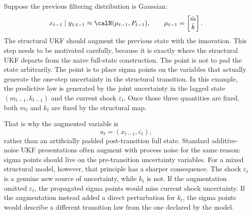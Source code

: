 Suppose the previous filtering distribution is Gaussian:
\begin{equation}
  x_{t-1}\mid y_{1:t-1}
  \approx \calN(\mu_{t-1},P_{t-1}),
  \qquad
  \mu_{t-1}=
  \begin{bmatrix}\bar m\\ \bar k\end{bmatrix}.
\end{equation}
The structural UKF should augment the previous state with the innovation.  This
step needs to be motivated carefully, because it is exactly where the structural
UKF departs from the naive full-state construction.  The point is not to pad the
state arbitrarily.  The point is to place sigma points on the variables that
actually generate the one-step uncertainty in the structural transition.  In
this example, the predictive law is generated by the joint uncertainty in the
lagged state $(m_{t-1},k_{t-1})$ and the current shock $\varepsilon_t$.  Once
those three quantities are fixed, both $m_t$ and $k_t$ are fixed by the
structural map.

That is why the augmented variable is
\begin{equation}
  a_t=(x_{t-1},\varepsilon_t),
  \label{eq:bf-ukf-augmented-variable}
\end{equation}
rather than an artificially padded post-transition full state.  Standard
additive-noise UKF presentations often augment with process noise for the same
reason: sigma points should live on the pre-transition uncertainty variables.
For a mixed structural model, however, that principle has a sharper consequence.
The shock $\varepsilon_t$ is a genuine new source of uncertainty, while $k_t$
is not.  If the augmentation omitted $\varepsilon_t$, the propagated sigma
points would miss current shock uncertainty.  If the augmentation instead added
a direct perturbation for $k_t$, the sigma points would describe a different
transition law from the one declared by the model.

